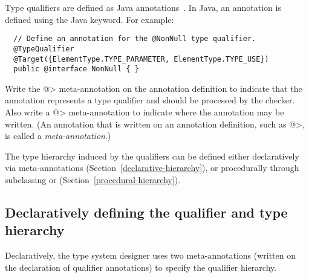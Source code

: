 
Type qualifiers are defined as Java annotations~\cite{JSR269}.  In Java, an
annotation is defined using the Java  keyword.
For example:

\begin{Verbatim}
  // Define an annotation for the @NonNull type qualifier.
  @TypeQualifier
  @Target({ElementType.TYPE_PARAMETER, ElementType.TYPE_USE})
  public @interface NonNull { }
\end{Verbatim}

\noindent
Write the \<@> meta-annotation on the annotation definition
to indicate that the annotation represents a type qualifier
and should be processed by the checker.
Also write a \<@>
meta-annotation to indicate where the annotation may be written.
(An annotation that is written on an annotation
definition, such as \<@>, is called a \emph{meta-annotation}.)


The type hierarchy induced by the qualifiers can be defined either
declaratively via meta-annotations (Section~\ref{declarative-hierarchy}), or procedurally through
subclassing  or
 (Section~\ref{procedural-hierarchy}).


\subsection{Declaratively defining the qualifier and type hierarchy\label{declarative-hierarchy}}

Declaratively, the type system designer uses two meta-annotations (written
on the declaration of qualifier annotations) to specify the qualifier
hierarchy.

